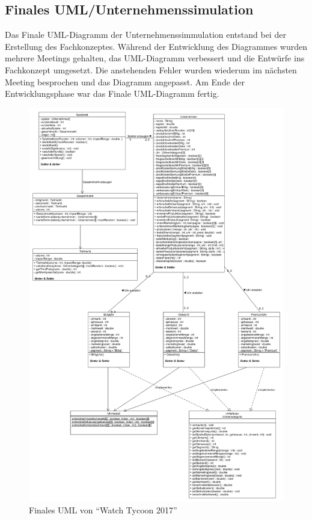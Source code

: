 \subsection{Finales UML/Unternehmenssimulation}
Das Finale UML-Diagramm der Unternehmenssimmulation entstand bei der Erstellung des Fachkonzeptes. Während der Entwicklung des Diagrammes wurden mehrere Meetings gehalten, das UML-Diagramm verbessert und die Entwürfe ins Fachkonzept umgesetzt. Die anstehenden Fehler wurden wiederum im nächsten Meeting besprochen und das Diagramm angepasst. Am Ende der Entwicklungsphase war das Finale UML-Diagramm fertig.
\begin{figure} [!h]
	\centering
	\includegraphics[scale=0.3]{img/Unternehmenssimmulation_final.png} 
	\caption{Finales UML von \enquote{Watch Tycoon 2017}} \label{fig:umlfinal}
\end{figure}
\clearpage
